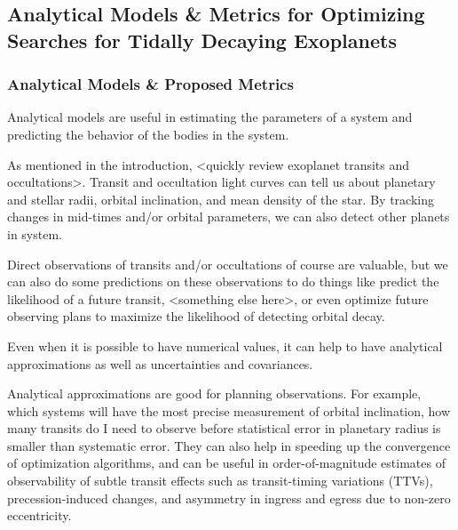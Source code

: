\documentclass[oneside,12pt]{amsart}
\numberwithin{page}{section}
\begin{document}
\clearpage


\subsection{Analytical Models \& Metrics for Optimizing Searches for Tidally Decaying Exoplanets}

\subsubsection{Analytical Models \& Proposed Metrics}

Analytical models are useful in estimating the parameters of a system and predicting the behavior of the bodies in the system. 

As mentioned in the introduction, <quickly review exoplanet transits and occultations>. Transit and occultation light curves can tell us about planetary and stellar radii, orbital inclination, and mean density of the star. By tracking changes in mid-times and/or orbital parameters, we can also detect other planets in system.

Direct observations of transits and/or occultations of course are valuable, but we can also do some predictions on these observations to do things like predict the likelihood of a future transit, <something else here>, or even optimize future observing plans to maximize the likelihood of detecting orbital decay. 

Even when it is possible to have numerical values, it can help to have analytical approximations as well as uncertainties and covariances. 

Analytical approximations are good for planning observations. For example, which systems will have the most precise measurement of orbital inclination, how many transits do I need to observe before statistical error in planetary radius is smaller than systematic error. They can also help in speeding up the convergence of optimization algorithms, and can be useful in order-of-magnitude estimates of observability of subtle transit effects such as transit-timing variations (TTVs), precession-induced changes, and asymmetry in ingress and egress due to non-zero eccentricity.
\end{document}
